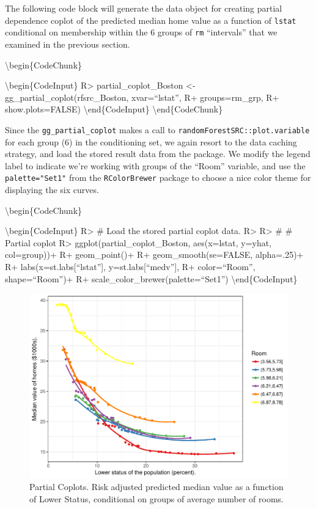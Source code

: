 \documentclass[article]{jss}
\begin{document}
The following code block will generate the data object for creating
partial dependence coplot of the predicted median home value as a
function of \texttt{lstat} conditional on membership within the 6 groups
of \texttt{rm} ``intervals'' that we examined in the previous section.

\textbackslash{}begin\{CodeChunk\}

\textbackslash{}begin\{CodeInput\} R\textgreater{}
partial\_coplot\_Boston \textless{}- gg\_partial\_coplot(rfsrc\_Boston,
xvar=``lstat'', R+ groups=rm\_grp, R+ show.plots=FALSE)
\textbackslash{}end\{CodeInput\} \textbackslash{}end\{CodeChunk\}

Since the \texttt{gg\_partial\_coplot} makes a call to
\texttt{randomForestSRC::plot.variable} for each group (6) in the
conditioning set, we again resort to the data caching strategy, and load
the stored result data from the  package. We modify
the legend label to indicate we're working with groups of the ``Room''
variable, and use the \texttt{palette="Set1"} from the
\texttt{RColorBrewer} package \citep{rcolorbrewer:2014} to choose a nice
color theme for displaying the six curves.

\textbackslash{}begin\{CodeChunk\}

\textbackslash{}begin\{CodeInput\} R\textgreater{} \# Load the stored
partial coplot data. R\textgreater{} R\textgreater{} \# \# Partial
coplot R\textgreater{} ggplot(partial\_coplot\_Boston, aes(x=lstat,
y=yhat, col=group))+ R+ geom\_point()+ R+ geom\_smooth(se=FALSE,
alpha=.25)+ R+ labs(x=st.labs{[}``lstat''{]}, y=st.labs{[}``medv''{]},
R+ color=``Room'', shape=``Room'')+ R+
scale\_color\_brewer(palette=``Set1'') \textbackslash{}end\{CodeInput\}

\begin{figure}

{\centering \includegraphics{Regression-rfsrc_files/figure-latex/prtl-coplots-1} 

}

\caption[Partial Coplots]{Partial Coplots. Risk adjusted predicted median value as a function of Lower Status, conditional on groups of average number of rooms.}\label{fig:prtl-coplots}
\end{figure}
\end{document}
